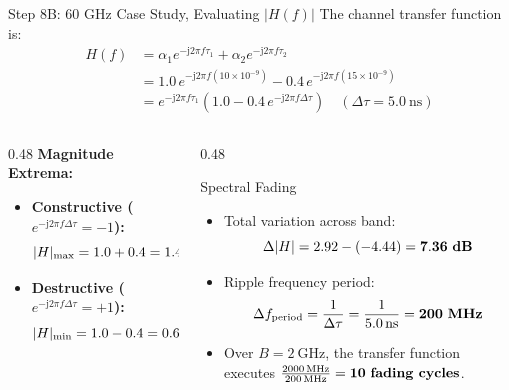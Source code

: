 \documentclass[10pt,aspectratio=169]{beamer}
\newcommand{\jj}{\mathrm{j}}
\begin{document}
\begin{frame}{Step 8B: 60 GHz Case Study, Evaluating $|H(f)|$}
  The channel transfer function is:
  \begin{align}
    H(f) &= \alpha_1 e^{-\jj 2\pi f \tau_1} + \alpha_2 e^{-\jj 2\pi f \tau_2} \nonumber \\
         &= 1.0 \, e^{-\jj 2\pi f (10 \times 10^{-9})} - 0.4 \, e^{-\jj 2\pi f (15 \times 10^{-9})} \nonumber \\
         &= e^{-\jj 2\pi f \tau_1} \left( 1.0 - 0.4 \, e^{-\jj 2\pi f \Delta\tau} \right) \quad (\Delta\tau = \SI{5.0}{\nano\second})
  \end{align}

  \begin{columns}[T]
    \begin{column}{0.48\textwidth}
      \textbf{Magnitude Extrema:}
      \begin{itemize}
        \item \textbf{Constructive ($e^{-\jj 2\pi f \Delta\tau} = -1$):}
        \begin{equation}
          |H|_{\max} = 1.0 + 0.4 = 1.4 \implies \mathbf{+2.92\text{ \textbf{dB}}}
        \end{equation}
        \item \textbf{Destructive ($e^{-\jj 2\pi f \Delta\tau} = +1$):}
        \begin{equation}
          |H|_{\min} = 1.0 - 0.4 = 0.6 \implies \mathbf{-4.44\text{ \textbf{dB}}}
        \end{equation}
      \end{itemize}
    \end{column}

    \begin{column}{0.48\textwidth}
      \begin{alertblock}{Spectral Fading}
      \small
        \begin{itemize}
          \item Total variation across band:
          \begin{equation*}
            \Delta|H| = 2.92 - (-4.44) = \mathbf{7.36\text{ \textbf{dB}}}
          \end{equation*}
          \item Ripple frequency period:
          \begin{equation}
            \Delta f_{\mathrm{period}} = \frac{1}{\Delta\tau} = \frac{1}{\SI{5.0}{\nano\second}} = \mathbf{200\text{ \textbf{MHz}}}
          \end{equation}
          \item Over $B = \SI{2}{\giga\hertz}$, the transfer function executes $\frac{\SI{2000}{\mega\hertz}}{\SI{200}{\mega\hertz}} = \mathbf{10\text{ \textbf{fading cycles}}}$.
        \end{itemize}
      \end{alertblock}
    \end{column}
  \end{columns}
\end{frame}
\end{document}
